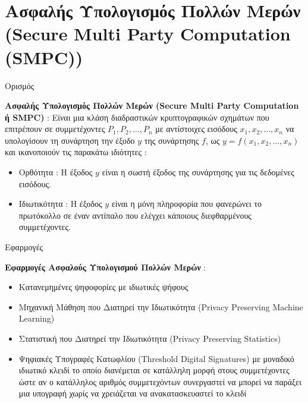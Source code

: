 \documentclass[10pt]{beamer}
\begin{document}
    \section{Ασφαλής Υπολογισμός Πολλών Μερών \\ (Secure Multi Party Computation (SMPC))}
    \begin{frame}{Ορισμός}
        \begin{block}{}
            \textbf{Ασφαλής Υπολογισμός Πολλών Μερών (Secure Multi Party Computation ή SMPC)} : Είναι μια κλάση διαδραστικών κρυπτογραφικών σχημάτων που επιτρέπουν σε συμμετέχοντες $P_1, P_2, \dots, P_n$ με αντίστοιχες εισόδους $x_1, x_2, \dots, x_n$ να υπολογίσουν τη συνάρτηση την έξοδο $y$ της συνάρτησης $f$, ως $y = f(x_1, x_2, \dots, x_n)$ και ικανοποιούν τις παρακάτω ιδιότητες :
            \begin{itemize}
                \item Ορθότητα : Η έξοδος $y$ είναι η σωστή έξοδος της συνάρτησης για τις δεδομένες εισόδους.
                \item Ιδιωτικότητα : Η έξοδος $y$ είναι η μόνη πληροφορία που φανερώνει το πρωτόκολλο σε έναν αντίπαλο που ελέγχει κάποιους διεφθαρμένους συμμετέχοντες.
            \end{itemize}
        \end{block}
    \end{frame}

    \begin{frame}{Εφαρμογές}
        \begin{block}{}
            \textbf{Εφαρμογές Ασφαλούς Υπολογισμού Πολλών Μερών} :
            \begin{itemize}
                \item Κατανεμημένες ψηφοφορίες με ιδιωτικές ψήφους
                \item Μηχανική Μάθηση που Διατηρεί την Ιδιωτικότητα (Privacy Preserving Machine Learning)
                \item Στατιστική που Διατηρεί την Ιδιωτικότητα (Privacy Preserving Statistics)
                \item Ψηφιακές Υπογραφές Κατωφλίου (Threshold Digital Signatures) με μοναδικό ιδιωτικό κλειδί το οποίο διανέμεται σε κατάλληλη μορφή στους συμμετέχοντες ώστε αν ο κατάλληλος αριθμός συμμετεχόντων συνεργαστεί να μπορεί να παράξει μια υπογραφή χωρίς να χρειάζεται να ανακατασκευαστεί το κλειδί
            \end{itemize}
        \end{block}
    \end{frame}
\end{document}
